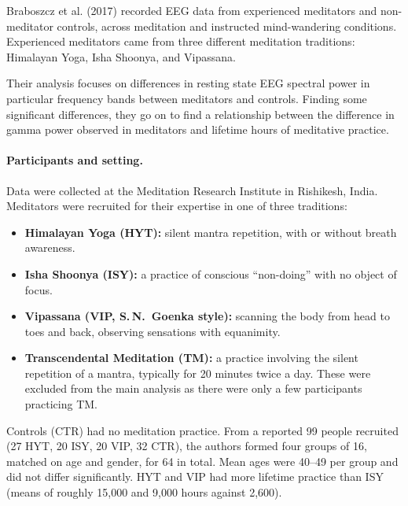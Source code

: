 \documentclass[10pt,a4paper]{article}
\begin{document}
\label{sec:paper}

Braboszcz et al. (2017) recorded EEG data from experienced meditators and non-meditator controls, across 
meditation and instructed mind-wandering conditions. Experienced meditators came from three different
meditation traditions: Himalayan Yoga, Isha Shoonya, and Vipassana. 

Their analysis focuses on differences in resting state EEG spectral power in particular frequency bands between
meditators and controls. Finding some significant differences, they go on to find a relationship between
the difference in gamma power observed in meditators and lifetime hours of meditative practice.

\paragraph{Participants and setting.} Data were collected at the Meditation Research Institute in Rishikesh,
India. Meditators were recruited for their expertise in one of three traditions:
\begin{itemize}
  \item \textbf{Himalayan Yoga (HYT):} silent mantra repetition, with or without breath awareness.
  \item \textbf{Isha Shoonya (ISY):} a practice of conscious ``non-doing'' with no object of focus.
  \item \textbf{Vipassana (VIP, S.\,N.\ Goenka style):} scanning the body from head to toes and back, observing
        sensations with equanimity.
      \item \textbf{Transcendental Meditation (TM):} a practice involving the silent repetition of a mantra, 
      typically for 20 minutes twice a day. These were excluded from the main analysis as there were only a few participants practicing TM.
\end{itemize}
Controls (CTR) had no meditation practice. From a reported 99 people recruited (27 HYT, 20 ISY, 20 VIP, 32 CTR), 
the authors formed four groups of 16, matched on age and gender, for 64 in total. 
Mean ages were 40--49 per group and did not differ significantly. HYT and VIP had more lifetime practice 
than ISY (means of roughly 15{,}000 and 9{,}000 hours against 2{,}600).
\end{document}
